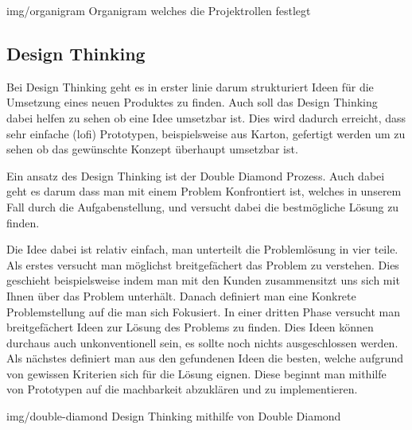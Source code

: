 \image
  {img/organigram}
  {Organigram welches die Projektrollen festlegt}

\subsection{Design Thinking}
\label{sec:design-thinking}

Bei Design Thinking \cite{Wikipedia-Design-Thinking} geht es in erster linie darum strukturiert 
Ideen für die Umsetzung eines neuen Produktes zu finden. Auch soll das Design Thinking
dabei helfen zu sehen ob eine Idee umsetzbar ist. Dies wird dadurch erreicht,
dass sehr einfache (\acrshort{lofi}) Prototypen, beispielsweise aus Karton, 
gefertigt werden um zu sehen ob das gewünschte Konzept überhaupt umsetzbar ist.

Ein ansatz des Design Thinking ist der Double Diamond Prozess. Auch dabei geht es
darum dass man mit einem Problem Konfrontiert ist, welches in unserem Fall durch die 
Aufgabenstellung, und versucht dabei die bestmögliche Lösung zu finden.

Die Idee dabei ist relativ einfach, man unterteilt die Problemlösung in vier teile.
Als erstes versucht man möglichst breitgefächert das Problem zu verstehen. Dies geschieht
beispielsweise indem man mit den Kunden zusammensitzt uns sich mit Ihnen über das Problem unterhält.
Danach definiert man eine Konkrete Problemstellung auf die man sich Fokusiert.
In einer dritten Phase versucht man breitgefächert Ideen zur Lösung des Problems zu finden.
Dies Ideen können durchaus auch unkonventionell sein, es sollte noch nichts ausgeschlossen werden.
Als nächstes definiert man aus den gefundenen Ideen
die besten, welche aufgrund von gewissen Kriterien sich für die Lösung eignen.
Diese beginnt man mithilfe von Prototypen auf die machbarkeit abzuklären und zu implementieren.

\image
  {img/double-diamond}
  {Design Thinking mithilfe von Double Diamond}